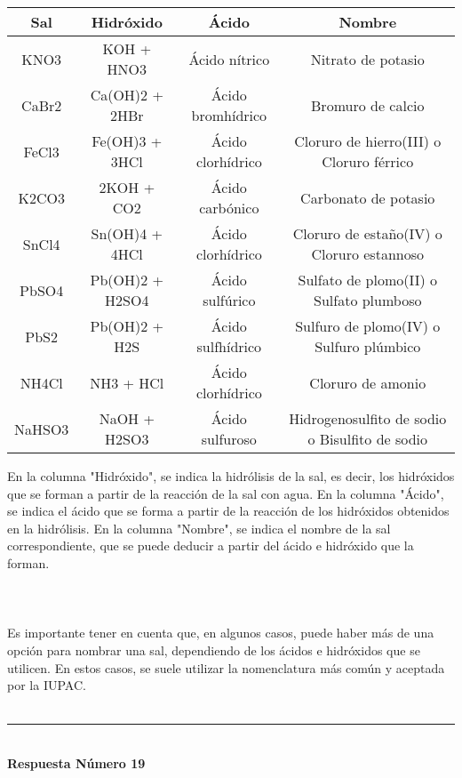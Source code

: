 \documentclass{article}
\begin{document}
\begin{table}[h]
\centering
\begin{tabular}{|c|c|c|c|}
\hline
Sal     & Hidróxido             & Ácido            & Nombre                                       \\ \hline
KNO3    & KOH + HNO3            & Ácido nítrico    & Nitrato de potasio                           \\ \hline
CaBr2   & Ca(OH)2 + 2HBr        & Ácido bromhídrico & Bromuro de calcio                            \\ \hline
FeCl3   & Fe(OH)3 + 3HCl        & Ácido clorhídrico & Cloruro de hierro(III) o Cloruro férrico     \\ \hline
K2CO3   & 2KOH + CO2            & Ácido carbónico  & Carbonato de potasio                         \\ \hline
SnCl4   & Sn(OH)4 + 4HCl        & Ácido clorhídrico & Cloruro de estaño(IV) o Cloruro estannoso    \\ \hline
PbSO4   & Pb(OH)2 + H2SO4       & Ácido sulfúrico  & Sulfato de plomo(II) o Sulfato plumboso      \\ \hline
PbS2    & Pb(OH)2 + H2S         & Ácido sulfhídrico & Sulfuro de plomo(IV) o Sulfuro plúmbico      \\ \hline
NH4Cl   & NH3 + HCl             & Ácido clorhídrico & Cloruro de amonio                            \\ \hline
NaHSO3  & NaOH + H2SO3          & Ácido sulfuroso  & Hidrogenosulfito de sodio o Bisulfito de sodio\\ \hline
\end{tabular}
\end{table}En la columna "Hidróxido", se indica la hidrólisis de la sal, es decir, los hidróxidos que se forman a partir de la reacción de la sal con agua. En la columna "Ácido", se indica el ácido que se forma a partir de la reacción de los hidróxidos obtenidos en la hidrólisis. En la columna "Nombre", se indica el nombre de la sal correspondiente, que se puede deducir a partir del ácido e hidróxido que la forman.\\\\
\\\\
Es importante tener en cuenta que, en algunos casos, puede haber más de una opción para nombrar una sal, dependiendo de los ácidos e hidróxidos que se utilicen. En estos casos, se suele utilizar la nomenclatura más común y aceptada por la IUPAC.\\\\
\noindent\rule{\textwidth}{1pt} \\
\textbf{Respuesta Número 19} \\
\end{document}
